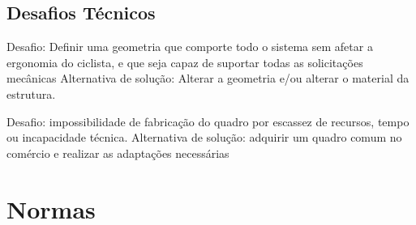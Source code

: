 	
	
	
	\subsection{Desafios Técnicos}
	Desafio: Definir uma geometria que comporte todo o sistema sem afetar a ergonomia do ciclista, e que seja capaz de suportar todas as solicitações mecânicas
Alternativa de solução: Alterar a geometria e/ou alterar o material da estrutura.

Desafio: impossibilidade de fabricação do quadro  por escassez de recursos, tempo ou incapacidade técnica.
Alternativa de solução: adquirir um quadro comum no comércio e realizar as adaptações necessárias

  \section{Normas}
  